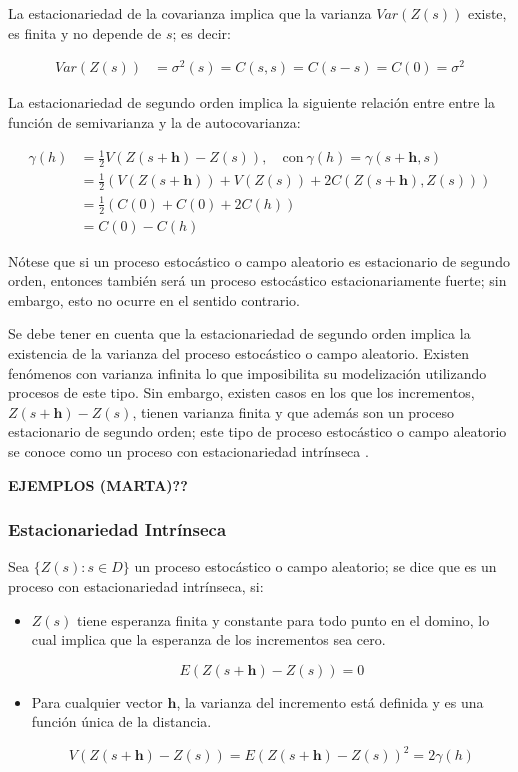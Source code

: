\documentclass[
]{book}
\begin{document}
La estacionariedad de la covarianza implica que la varianza \(Var(Z(s))\) existe, es finita y no depende de \(s\); es decir:

\begin{align*}
        Var(Z(s))&=\sigma^2(s)=C(s,s)=C(s-s)=C(0)=\sigma^2  
\end{align*}

La estacionariedad de segundo orden implica la siguiente relación entre entre la función de semivarianza y la de autocovarianza:

\begin{align*}
    \gamma(h)&=\frac{1}{2}V(Z(s+\textbf{h})-Z(s)), \quad \text{con} \ \gamma(h)=\gamma(s+\textbf{h},s)\\
&=\frac{1}{2}(V(Z(s+\textbf{h}))+V(Z(s))+2C(Z(s+\textbf{h}),Z(s)))\\
&=\frac{1}{2}(C(0)+C(0)+2C(h))\\
&=C(0)-C(h)
\end{align*}

Nótese que si un proceso estocástico o campo aleatorio es estacionario de segundo orden, entonces también será un proceso estocástico estacionariamente fuerte; sin embargo, esto no ocurre en el sentido contrario.

Se debe tener en cuenta que la estacionariedad de segundo orden implica la existencia de la varianza del proceso estocástico o campo aleatorio. Existen fenómenos con varianza infinita lo que imposibilita su modelización utilizando procesos de este tipo. Sin embargo, existen casos en los que los incrementos, \(Z(s+\textbf{h})-Z(s)\), tienen varianza finita y que además son un proceso estacionario de segundo orden; este tipo de proceso estocástico o campo aleatorio se conoce como un proceso con estacionariedad intrínseca \citep{montero}.

\textbf{EJEMPLOS (MARTA)??}

\hypertarget{estacionariedad-intruxednseca}{%
\subsubsection*{Estacionariedad Intrínseca}\label{estacionariedad-intruxednseca}}

Sea \(\{Z(s): s\in D\}\) un proceso estocástico o campo aleatorio; se dice que es un proceso con estacionariedad intrínseca, si:

\begin{itemize}
\item
  \(Z(s)\) tiene esperanza finita y constante para todo punto en el domino, lo cual implica que la esperanza de los incrementos sea cero.

  \[E(Z(s+\textbf{h})-Z(s))=0\]
\item
  Para cualquier vector \(\textbf{h}\), la varianza del incremento está definida y es una función única de la distancia.

  \[V(Z(s+\textbf{h})-Z(s))=E(Z(s+\textbf{h})-Z(s))^2=2\gamma(h)\]
\end{itemize}
\end{document}
